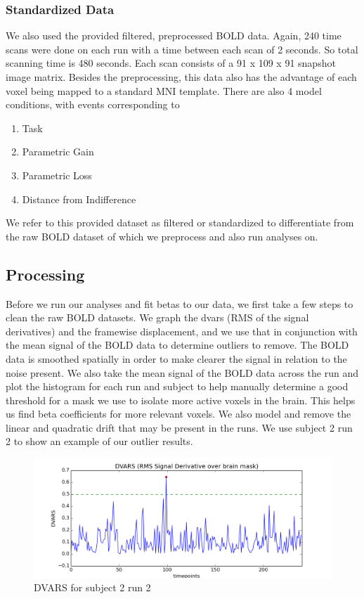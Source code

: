 \documentclass[11pt]{article}
\begin{document}
\subsubsection{Standardized Data}
We also used the provided filtered, preprocessed BOLD data. Again, 240 time scans 
were done on each run with a time between each scan of 2 seconds. So total scanning 
time is 480 seconds. Each scan consists of a 91 x 109 x 91 snapshot image
matrix. Besides the preprocessing, this data also has the advantage of each 
voxel being mapped to a standard MNI template. There are also 4 model 
conditions, with events corresponding to 
\begin{enumerate}
  \item Task
  \item Parametric Gain
  \item Parametric Loss
  \item Distance from Indifference
\end{enumerate}
We refer to this provided dataset as filtered or standardized to differentiate from the raw
BOLD dataset of which we preprocess and also run analyses on.

\subsection{Processing}
Before we run our analyses and fit betas to our data, we first take a few 
steps to clean the raw BOLD datasets. We graph the dvars (RMS of the signal 
derivatives) and the framewise displacement, and we use that in conjunction 
with the mean signal of the BOLD data to determine outliers to remove. The 
BOLD data is smoothed spatially in order to make clearer the signal in 
relation to the noise present. We also take the mean signal of the BOLD data 
across the run and plot the histogram for each run and subject to help 
manually determine a good threshold for a mask we use to isolate more active 
voxels in the brain. This helps us find beta coefficients for more relevant 
voxels. We also model and remove the linear and quadratic drift that may be 
present in the runs. 
We use subject 2 run 2 to show an example of our outlier results.

\begin{figure}[H]
    \centering
        \includegraphics[scale=0.4]{figures/dvars_sub2run2.png}
    \caption{DVARS for subject 2 run 2}
\end{figure}
\end{document}
